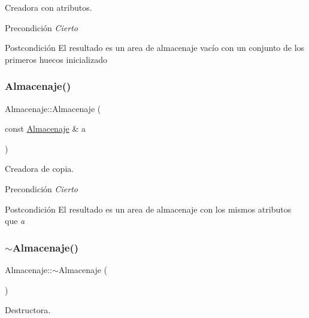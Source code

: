 Creadora con atributos. 

\begin{DoxyPrecond}{Precondición}
{\itshape Cierto} 
\end{DoxyPrecond}
\begin{DoxyPostcond}{Postcondición}
El resultado es un area de almacenaje vacío con un conjunto de los primeros huecos inicializado 
\end{DoxyPostcond}
\mbox{\label{class_almacenaje_af76b03e29489309e937d5a3b73bd77a4}} 
\subsubsection{\texorpdfstring{Almacenaje()}{Almacenaje()}\hspace{0.1cm}{\footnotesize\ttfamily [3/3]}}
{\footnotesize\ttfamily Almacenaje\+::\+Almacenaje (\begin{DoxyParamCaption}\item[{const \hyperlink{class_almacenaje}{Almacenaje} \&}]{a }\end{DoxyParamCaption})}



Creadora de copia. 

\begin{DoxyPrecond}{Precondición}
{\itshape Cierto} 
\end{DoxyPrecond}
\begin{DoxyPostcond}{Postcondición}
El resultado es un area de almacenaje con los mismos atributos que {\itshape a} 
\end{DoxyPostcond}
\mbox{\label{class_almacenaje_a81867a2596bd5b0d654803fc34d8bc9a}} 
\subsubsection{\texorpdfstring{$\sim$\+Almacenaje()}{~Almacenaje()}}
{\footnotesize\ttfamily Almacenaje\+::$\sim$\+Almacenaje (\begin{DoxyParamCaption}{ }\end{DoxyParamCaption})}



Destructora. 

